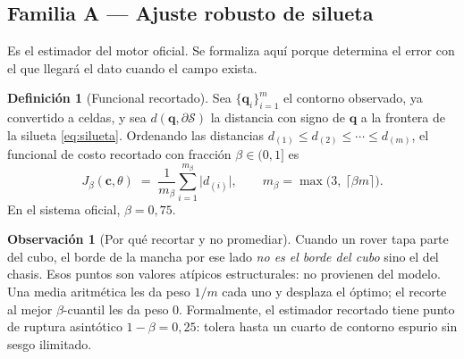 \documentclass[11pt,a4paper]{article}
\theoremstyle{definition}
\newtheorem{definicion}[teorema]{Definición}
\newtheorem{observacion}[teorema]{Observación}
\newcommand{\cc}{\mathbf{c}}
\newcommand{\qq}{\mathbf{q}}
\begin{document}
\subsection{Familia A --- Ajuste robusto de silueta}

Es el estimador del motor oficial. Se formaliza aquí porque determina el error con el
que llegará el dato cuando el campo exista.

\begin{definicion}[Funcional recortado]
Sea $\{\qq_i\}_{i=1}^{m}$ el contorno observado, ya convertido a celdas, y sea
$d(\qq, \partial \mathcal S)$ la distancia con signo de $\qq$ a la frontera de la
silueta \eqref{eq:silueta}. Ordenando las distancias
$d_{(1)} \le d_{(2)} \le \cdots \le d_{(m)}$, el funcional de costo recortado con
fracción $\beta \in (0,1]$ es
\begin{equation}
  J_\beta(\cc,\theta) \;=\; \frac{1}{m_\beta}\sum_{i=1}^{m_\beta} \big|d_{(i)}\big|,
  \qquad m_\beta = \max\big(3,\ \lceil \beta m\rceil\big).
  \label{eq:trimmed}
\end{equation}
En el sistema oficial, $\beta = 0{,}75$.
\end{definicion}

\begin{observacion}[Por qué recortar y no promediar]
Cuando un rover tapa parte del cubo, el borde de la mancha por ese lado \emph{no es el
borde del cubo} sino el del chasis. Esos puntos son valores atípicos estructurales: no
provienen del modelo. Una media aritmética les da peso $1/m$ cada uno y desplaza el
óptimo; el recorte al mejor $\beta$-cuantil les da peso $0$. Formalmente, el
estimador recortado tiene punto de ruptura asintótico $1-\beta = 0{,}25$: tolera hasta
un cuarto de contorno espurio sin sesgo ilimitado.
\end{observacion}
\end{document}
